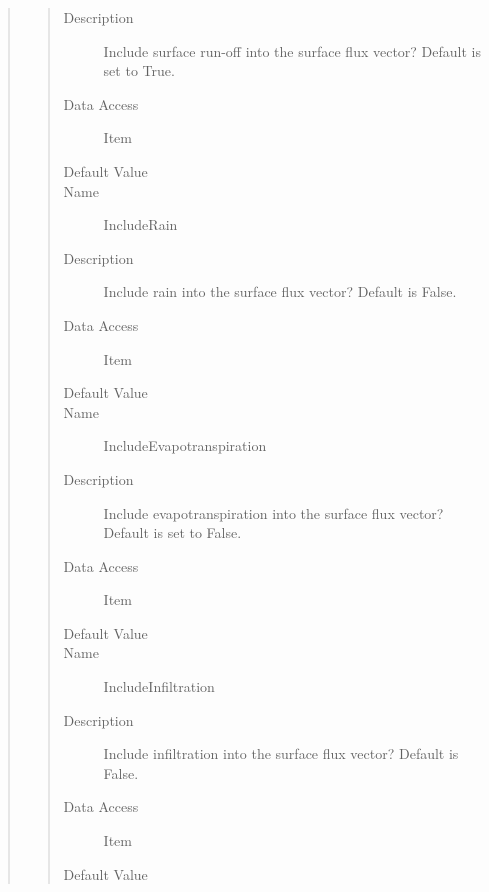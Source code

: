 \documentclass[letterpaper,10pt,english]{sphinxmanual}
\begin{document}
\begin{quote}
\begin{description}
\begin{quote}
\begin{description}
\item[{Description}] \leavevmode
Include surface run-off into the surface flux vector? Default is set to True.

\item[{Data Access}] \leavevmode
Item

\item[{Default Value}] \leavevmode
{}

\item[{Name}] \leavevmode
IncludeRain

\item[{Description}] \leavevmode
Include rain into the surface flux vector? Default is False.

\item[{Data Access}] \leavevmode
Item

\item[{Default Value}] \leavevmode
{}

\item[{Name}] \leavevmode
IncludeEvapotranspiration

\item[{Description}] \leavevmode
Include evapotranspiration into the surface flux vector? Default is set to False.

\item[{Data Access}] \leavevmode
Item

\item[{Default Value}] \leavevmode
{}

\item[{Name}] \leavevmode
IncludeInfiltration

\item[{Description}] \leavevmode
Include infiltration into the surface flux vector? Default is False.

\item[{Data Access}] \leavevmode
Item

\item[{Default Value}] \leavevmode
{}


\end{description}
\end{quote}
\end{description}
\end{quote}
\end{document}
